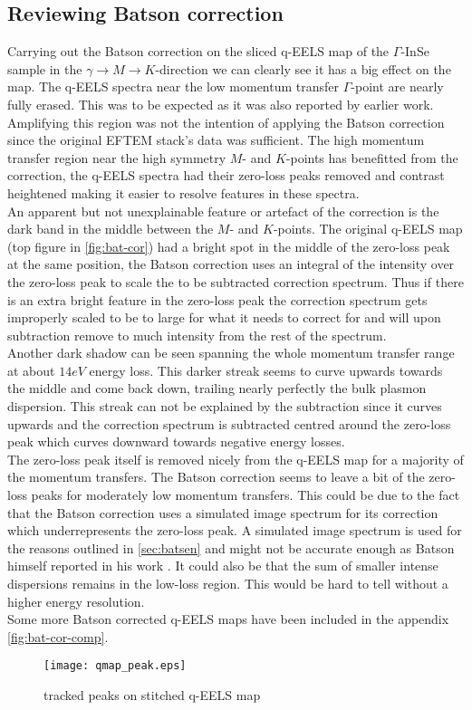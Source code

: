 \subsection{Reviewing Batson correction}
Carrying out the Batson correction on the sliced q-EELS map of the $\Gamma$-InSe sample in the $\gamma \rightarrow M \rightarrow K$-direction we can clearly see it has a big effect on the map. The q-EELS spectra near the low momentum transfer $\Gamma$-point are nearly fully erased. This was to be expected as it was also reported by earlier work.\cite{Schneider:191230} Amplifying this region was not the intention of applying the Batson correction since the original EFTEM stack's data was sufficient. The high momentum transfer region near the high symmetry $M$- and $K$-points has benefitted from the correction, the q-EELS spectra had their zero-loss peaks removed and contrast heightened making it easier to resolve features in these spectra.\\
An apparent but not unexplainable feature or artefact of the correction is the dark band in the middle between the $M$- and $K$-points. The original q-EELS map (top figure in \ref{fig:bat-cor}) had a bright spot in the middle of the zero-loss peak at the same position, the Batson correction uses an integral of the intensity over the zero-loss peak to scale the to be subtracted correction spectrum. Thus if there is an extra bright feature in the zero-loss peak the correction spectrum gets improperly scaled to be to large for what it needs to correct for and will upon subtraction remove to much intensity from the rest of the spectrum.\\
Another dark shadow can be seen spanning the whole momentum transfer range at about $14eV$ energy loss. This darker streak seems to curve upwards towards the middle and come back down, trailing nearly perfectly the bulk plasmon dispersion. This streak can not be explained by the subtraction since it curves upwards and the correction spectrum is subtracted centred around the zero-loss peak which curves downward towards negative energy losses.\\
The zero-loss peak itself is removed nicely from the q-EELS map for a majority of the momentum transfers. The Batson correction seems to leave a bit of the zero-loss peaks for moderately low momentum transfers. This could be due to the fact that the Batson correction uses a simulated image spectrum for its correction which underrepresents the zero-loss peak. A simulated image spectrum is used for the reasons outlined in \ref{sec:batsen} and might not be accurate enough as Batson himself reported in his work \cite{PhysRevB.27.5224}. It could also be that the sum of smaller intense dispersions remains in the low-loss region. This would be hard to tell without a higher energy resolution.\\
Some more Batson corrected q-EELS maps have been included in the appendix \ref{fig:bat-cor-comp}.
\newpage
%
\begin{figure}[t]
	\centering
	\texttt{[image: qmap\_peak.eps]}
	\caption{tracked peaks on stitched q-EELS map}
	\label{fig:qmap-track}
\end{figure}
%
